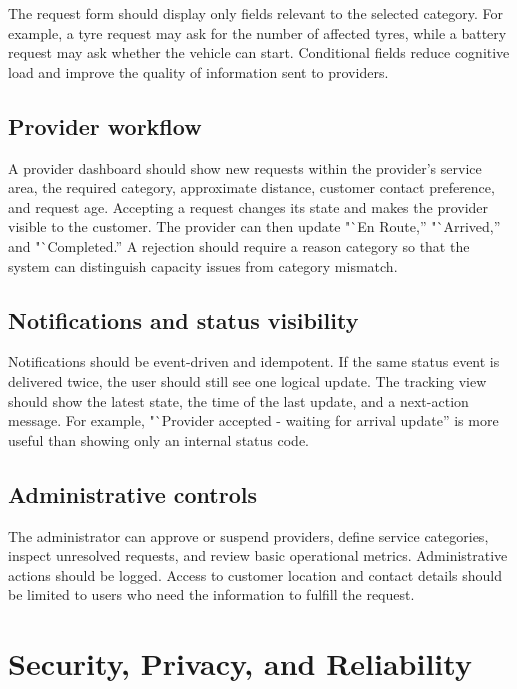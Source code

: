 \documentclass[conference]{IEEEtran}
\begin{document}
The request form should display only fields relevant to the selected category. For example, a tyre request may ask for the number of affected tyres, while a battery request may ask whether the vehicle can start. Conditional fields reduce cognitive load and improve the quality of information sent to providers.

\subsection{Provider workflow}
A provider dashboard should show new requests within the provider's service area, the required category, approximate distance, customer contact preference, and request age. Accepting a request changes its state and makes the provider visible to the customer. The provider can then update "`En Route,'' "`Arrived,'' and "`Completed.'' A rejection should require a reason category so that the system can distinguish capacity issues from category mismatch.

\subsection{Notifications and status visibility}
Notifications should be event-driven and idempotent. If the same status event is delivered twice, the user should still see one logical update. The tracking view should show the latest state, the time of the last update, and a next-action message. For example, "`Provider accepted - waiting for arrival update'' is more useful than showing only an internal status code.

\subsection{Administrative controls}
The administrator can approve or suspend providers, define service categories, inspect unresolved requests, and review basic operational metrics. Administrative actions should be logged. Access to customer location and contact details should be limited to users who need the information to fulfill the request.

\section{Security, Privacy, and Reliability}
\end{document}
